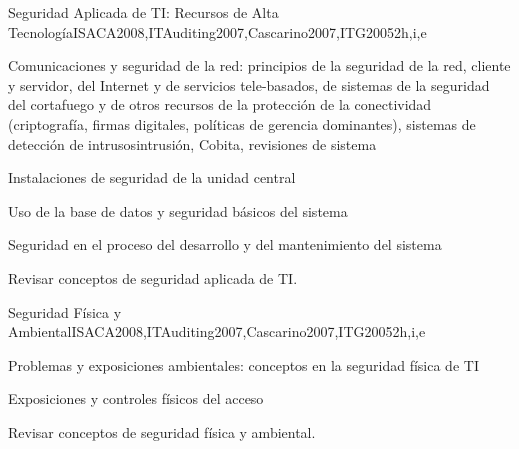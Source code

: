 \begin{syllabus}
    \begin{unit}{Seguridad Aplicada de TI: Recursos de Alta Tecnología}{}{ISACA2008,ITAuditing2007,Cascarino2007,ITG2005}{2}{h,i,e}
    \begin{topics}
    \item Comunicaciones y seguridad de la red: principios de la seguridad de la red, cliente y servidor, del Internet y de servicios tele-basados, de sistemas de la seguridad del cortafuego y de otros recursos de la protección de la conectividad (criptografía, firmas digitales, políticas de gerencia dominantes), sistemas de detección de intrusosintrusión, Cobita, revisiones de sistema
    \item Instalaciones de seguridad de la unidad central
    \item Uso de la base de datos y seguridad básicos del sistema
    \item Seguridad en el proceso del desarrollo y del mantenimiento del sistema
    \end{topics}
    \begin{learningoutcomes}
    \item Revisar conceptos de seguridad aplicada de TI.
    \end{learningoutcomes}
    \end{unit}
    
    \begin{unit}{Seguridad Física y Ambiental}{}{ISACA2008,ITAuditing2007,Cascarino2007,ITG2005}{2}{h,i,e}
    \begin{topics}
    \item Problemas y exposiciones ambientales: conceptos en la seguridad física de TI
    \item Exposiciones y controles físicos del acceso
    \end{topics}
    \begin{learningoutcomes}
    \item Revisar conceptos de seguridad física y ambiental.
    \end{learningoutcomes}
    \end{unit}
    

\end{syllabus}
